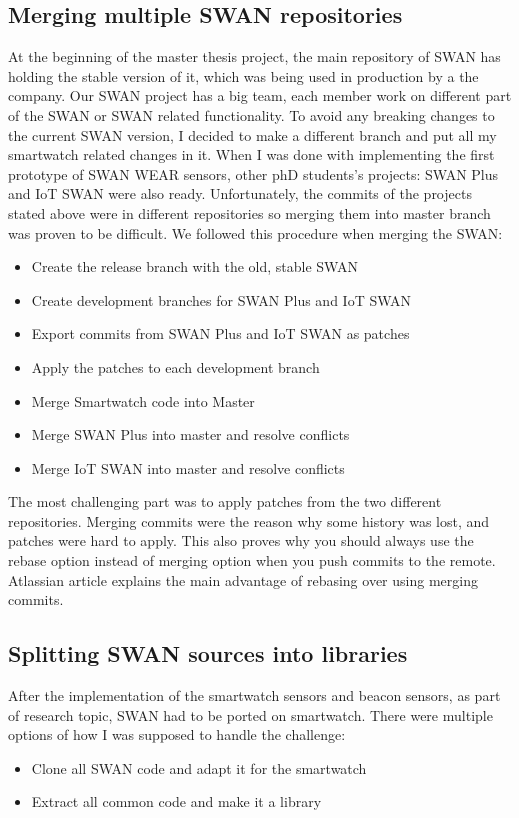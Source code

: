 \subsection{Merging multiple SWAN repositories}
At the beginning of the master thesis project, the main repository of SWAN has holding the stable version of it, which was being used in production 
by a the company. Our SWAN project has a big team, each member work on different part of the SWAN or SWAN related functionality.
To avoid any breaking changes to the current SWAN version, I decided to make a different branch and put all my smartwatch related changes in it.
When I was done with implementing the first prototype of SWAN WEAR sensors, other phD students's projects: SWAN Plus and IoT SWAN were also ready.
Unfortunately, the commits of the projects stated above were in different repositories so merging them into master branch was proven to be difficult.
We followed this procedure when merging the SWAN:
\begin{itemize}
 \item Create the release branch with the old, stable SWAN
 \item Create development branches for SWAN Plus and IoT SWAN
 \item Export commits from SWAN Plus and IoT SWAN as patches
 \item Apply the patches to each development branch
 \item Merge Smartwatch code into Master
 \item Merge SWAN Plus into master and resolve conflicts
 \item Merge IoT SWAN into master and resolve conflicts
\end{itemize}

The most challenging part was to apply patches from the two different repositories. Merging commits were the reason why some history was 
lost, and patches were hard to apply. This also proves why you should always use the rebase option instead of merging option when you push commits
to the remote. Atlassian article\cite{atlassian_merge_rebase} explains the main advantage of rebasing over using merging commits.

\subsection{Splitting SWAN sources into libraries}
After the implementation of the smartwatch sensors and beacon sensors, as part of research topic, SWAN had to be ported on smartwatch.
There were multiple options of how I was supposed to handle the challenge:
\begin{itemize}
 \item Clone all SWAN code and adapt it for the smartwatch
 \item Extract all common code and make it a library
\end{itemize}

